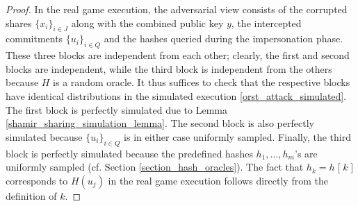 \documentclass[psamsfonts, reqno]{amsart}
\theoremstyle{definition}
\theoremstyle{remark}
\numberwithin{equation}{section}
\begin{document}
\begin{proof}
In the real game execution, the adversarial view consists of
the corrupted shares $\{x_i\}_{i \in J}$
along with the combined public key $y$,
the intercepted commitments $\{u_i\}_{i \in Q}$
and the hashes queried during the impersonation phase.
These three blocks are independent
from each other; clearly, the first and second blocks are
independent, while the third block is independent from the others
because $H$ is a random oracle.
It thus suffices to check that the respective blocks
have identical distributions in the simulated execution
\eqref{orst_attack_simulated}.
The first block is perfectly simulated
due to Lemma \ref{shamir_sharing_simulation_lemma}.
The second block is also perfectly simulated because
$\{u_i\}_{i \in Q}$ is in either case uniformly sampled.
Finally, the third block is perfectly simulated
because the predefined hashes
$h_1, \dots, h_m$'s are uniformly sampled
(cf. Section \ref{section_hash_oracles}).
The fact that
$h_k = h\hspace{1pt}[\hspace{1pt}k\hspace{1pt}]$
corresponds to $H(u_j)$ in the real game execution
follows directly from the definition of $k$.
\vspace{0pt}
\end{proof}
\end{document}
